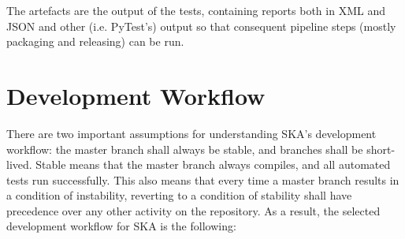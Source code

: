 \documentclass[a4paper,
	       keeplastbox,   %
	       References
	       ]{jacow}
\begin{document}
The artefacts are the output of the tests, containing reports both in XML and JSON and other (i.e. PyTest's) output so that consequent pipeline steps (mostly packaging and releasing) can be run.

\section{Development Workflow}
There are two important assumptions for understanding SKA's development workflow: the master branch shall always be stable, and branches shall be short-lived. Stable means that the master branch always compiles, and all automated tests run successfully. This also means that every time a master branch results in a condition of instability, reverting to a condition of stability shall have precedence over any other activity on the repository. As a result, the selected development workflow for SKA is the following:
\end{document}

